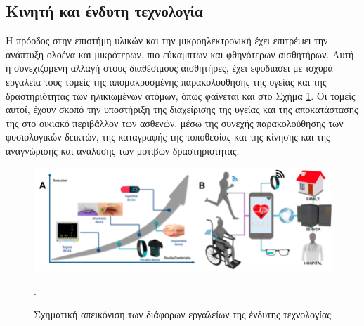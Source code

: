 \subsection{Κινητή και ένδυτη τεχνολογία}
Η πρόοδος στην επιστήμη υλικών και την μικροηλεκτρονική έχει επιτρέψει την ανάπτυξη ολοένα και μικρότερων, πιο εύκαμπτων και φθηνότερων αισθητήρων.
Αυτή η συνεχιζόμενη αλλαγή στους διαθέσιμους αισθητήρες, έχει εφοδιάσει με ισχυρά εργαλεία τους τομείς της απομακρυσμένης παρακολούθησης της υγείας και της δραστηριότητας των ηλικιωμένων ατόμων, όπως φαίνεται και στο Σχήμα \ref{wearable}.
Οι τομείς αυτοί, έχουν σκοπό την υποστήριξη της διαχείρισης της υγείας και της αποκατάστασης της στο οικιακό περιβάλλον των ασθενών, μέσω της συνεχής παρακολούθησης των φυσιολογικών δεικτών, της καταγραφής της τοποθεσίας και της κίνησης και της αναγνώρισης και ανάλυσης των μοτίβων δραστηριότητας.
\begin{figure}[h!]
\centering
\includegraphics[scale=0.5]{images/wearable.png}
\caption{Σχηματική απεικόνιση των διάφορων εργαλείων της ένδυτης τεχνολογίας}.
\label{wearable}
\end{figure}

